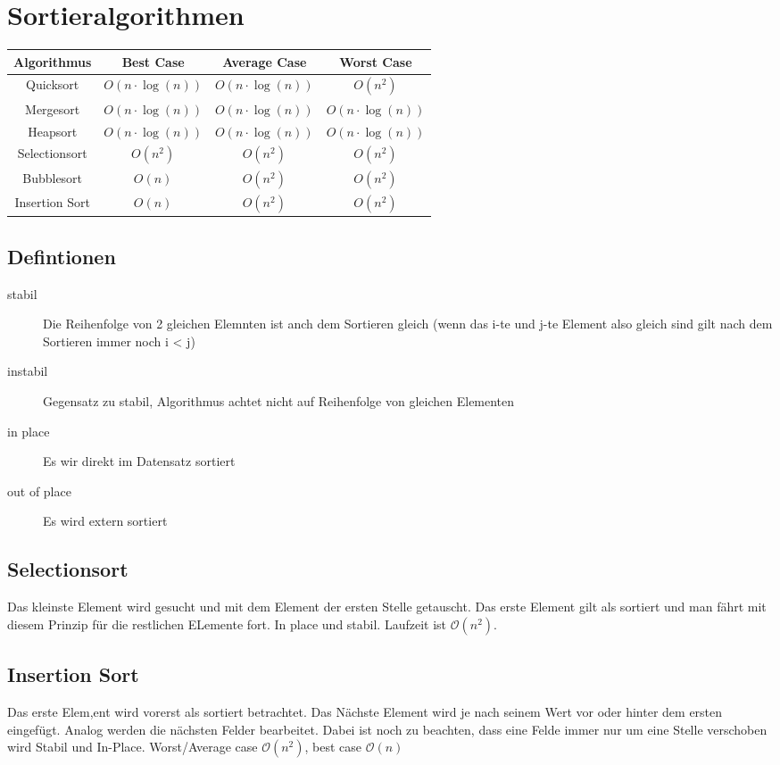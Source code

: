 \documentclass[a4paper]{scrartcl}
\begin{document}
    \section{Sortieralgorithmen}
    \begin{tabular}{|c|c|c|c|}
        \hline
        Algorithmus & Best Case & Average Case & Worst Case \\
        \hline
        Quicksort & $O(n \cdot \log(n))$ & $O(n \cdot \log(n))$ & $O(n^2)$ \\
        Mergesort & $O(n \cdot \log(n))$ & $O(n \cdot \log(n))$ & $O(n \cdot \log(n))$ \\
        Heapsort & $O(n \cdot \log(n))$ & $O(n \cdot \log(n))$ & $O(n \cdot \log(n))$ \\
        Selectionsort & $O(n^2)$ & $O(n^2)$ & $O(n^2)$ \\
        Bubblesort & $O(n)$ & $O(n^2)$ & $O(n^2)$ \\
        Insertion Sort & $O(n)$ & $O(n^2)$ & $O(n^2)$ \\
        \hline
    \end{tabular}

    \subsection{Defintionen}
        \begin{description}
            \item[stabil] Die Reihenfolge von 2 gleichen Elemnten ist anch dem Sortieren gleich (wenn das i-te und j-te Element also gleich sind gilt nach dem Sortieren immer noch i < j)
            \item[instabil] Gegensatz zu stabil, Algorithmus achtet nicht auf Reihenfolge von gleichen Elementen
            \item[in place] Es wir direkt im Datensatz sortiert
            \item[out of place] Es wird extern sortiert  
        \end{description}
    
        \subsection{Selectionsort}
            Das kleinste Element wird gesucht und mit dem Element der ersten Stelle getauscht. Das erste Element gilt als sortiert und man fährt mit diesem Prinzip
            für die restlichen ELemente fort. In place und stabil. Laufzeit ist \(\mathcal{O}(n^2)\).
        \subsection{Insertion Sort} 
            Das erste Elem,ent wird vorerst als sortiert betrachtet. Das Nächste Element wird je nach seinem Wert vor oder hinter dem ersten eingefügt. Analog werden die nächsten
            Felder bearbeitet. Dabei ist noch zu beachten, dass eine Felde immer nur um eine Stelle verschoben wird
            Stabil und In-Place. Worst/Average case \(\mathcal{O}(n^2)\), best case \(\mathcal{O}(n)\)
\end{document}
